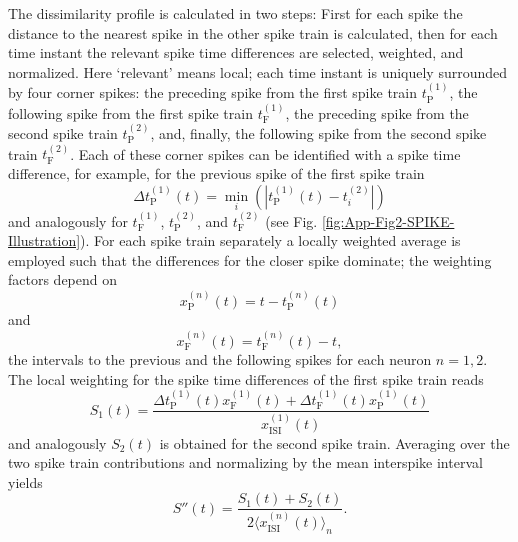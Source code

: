 \documentclass[10pt,twocolumn]{elsart5p}
\begin{document}
\begin{appendix}
The dissimilarity profile is calculated in two steps: First for each spike the distance to the nearest spike in the other spike train is calculated, then for each time instant the relevant spike time differences are selected, weighted, and normalized. Here `relevant' means local; each time instant is uniquely surrounded by four corner spikes: the preceding spike from the first spike train $t_{\mathrm {P}}^{(1)}$, the following spike from the first spike train $t_{\mathrm {F}}^{(1)}$, the preceding spike from the second spike train $t_{\mathrm {P}}^{(2)}$, and, finally, the following spike from the second spike train $t_{\mathrm {F}}^{(2)}$. Each of these corner spikes can be identified with a spike time difference, for example, for the previous spike of the first spike train
%
\begin{equation} \label{eq:Delta-Corner-Spike}
     \Delta t_{\mathrm {P}}^{(1)} (t) = \min_i (| t_{\mathrm {P}}^{(1)} (t) - t_i^{(2)} |)
\end{equation}
%
and analogously for $t_{\mathrm {F}}^{(1)}$, $t_{\mathrm {P}}^{(2)}$, and $t_{\mathrm {F}}^{(2)}$  (see Fig. \ref{fig:App-Fig2-SPIKE-Illustration}). For each spike train separately a locally weighted average is employed such that the differences for the closer spike dominate; the weighting factors depend on
%
\begin{equation} \label{eq:Prev-Spike-Dist}
     x_{\mathrm {P}}^{(n)} (t) = t - t_{\mathrm {P}}^{(n)} (t)
\end{equation}
%
and
%
\begin{equation} \label{eq:Foll-Spike-Dist}
     x_{\mathrm {F}}^{(n)} (t) = t_{\mathrm {F}}^{(n)} (t) - t,
\end{equation}
%
the intervals to the previous and the following spikes for each neuron $n = 1, 2$. The local weighting for the spike time differences of the first spike train reads
%
\begin{equation} \label{eq:Bi-Spike-Diss-First}
     S_1 (t) = \frac{\Delta t_{\mathrm {P}}^{(1)} (t) x_{\mathrm {F}}^{(1)} (t) + \Delta t_{\mathrm {F}}^{(1)} (t) x_{\mathrm {P}}^{(1)} (t)}{x_{\mathrm {ISI}}^{(1)} (t)}
\end{equation}
%
and analogously $S_2 (t)$ is obtained for the second spike train. Averaging over the two spike train contributions and normalizing by the mean interspike interval yields
%
\begin{equation} \label{eq:Bi-Spike-Diss-Intermediate}
     S'' (t) = \frac{S_1 (t) + S_2 (t)}{2 \langle x_{\mathrm {ISI}}^{(n)} (t) \rangle_n}.
\end{equation}


\end{appendix}
\end{document}
